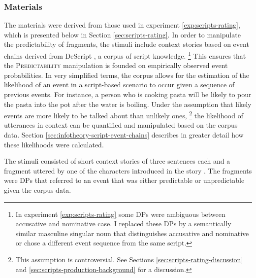 \subsubsection{Materials}
The materials were derived from those used in experiment \ref{exp:scripts-rating}, which is presented below in Section \ref{sec:scripts-rating}. In order to manipulate the predictability of fragments, the stimuli include context stories based on event chains derived from DeScript \citep{wanzare.etal2016}, a corpus of script knowledge.%
%
\footnote{In experiment \ref{exp:scripts-rating} some DPs were ambiguous between accusative and nominative case. I replaced these DPs by a semantically similar masculine singular noun that distinguishes accusative and nominative or chose a different event sequence from the same script.}\afterfn%
%
This ensures that the \textsc{Predictability} manipulation is founded on empirically observed event probabilities. In very simplified terms, the corpus allows for the estimation of the likelihood of an event in a script-based scenario to occur given a sequence of previous events. For instance, a person who is cooking pasta will be likely to pour the pasta into the pot after the water is boiling. Under the assumption that likely events are more likely to be talked about than unlikely ones,%
%
\footnote{This assumption is controversial. See Sections \ref{sec:scripts-rating-discussion} and \ref{sec:scripts-production-background} for a discussion.}\afterfn%
%
the likelihood of utterances in context can be quantified and manipulated based on the corpus data. Section \ref{sec:infotheory-script-event-chains} describes in greater detail how these likelihoods were calculated.

The stimuli consisted of short context stories of three sentences each and a fragment uttered by one of the characters introduced in the story \Next. The fragments were DPs that referred to an event that was either predictable \Next[a,b] or unpredictable \Next[c,d] given the corpus data. 

